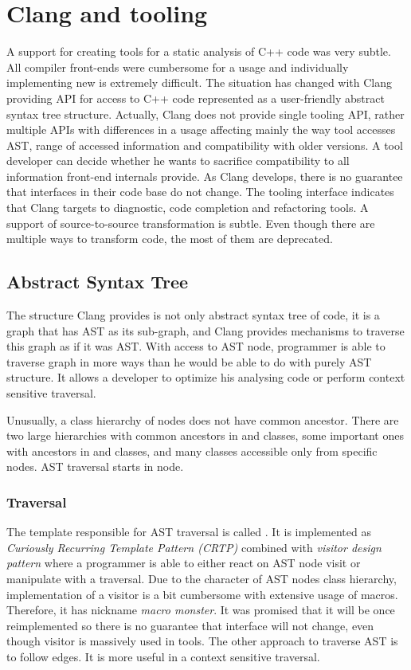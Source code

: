 \chapter{Clang and tooling}
\label{clang}
A support for creating tools for a static analysis of C++ code was very subtle. All compiler front-ends were cumbersome for a usage and individually implementing new is extremely difficult. The situation has changed with Clang providing API for access to C++ code represented as a user-friendly abstract syntax tree structure. Actually, Clang does not provide single tooling API, rather multiple APIs with differences in a usage affecting mainly the way tool accesses AST, range of accessed information and compatibility with older versions. A tool developer can decide whether he wants to sacrifice compatibility to all information front-end internals provide. As Clang develops, there is no guarantee that interfaces in their code base do not change. The tooling interface indicates that Clang targets to diagnostic, code completion and refactoring tools. A support of source-to-source transformation is subtle. Even though there are multiple ways to transform code, the most of them are deprecated.

\section{Abstract Syntax Tree}
The structure Clang provides is not only abstract syntax tree of code, it is a graph that has AST as its sub-graph, and Clang provides mechanisms to traverse this graph as if it was AST. With access to AST node, programmer is able to traverse graph in more ways than he would be able to do with purely AST structure. It allows a developer to optimize his analysing code or perform context sensitive traversal.

Unusually, a class hierarchy of nodes does not have common ancestor. There are two large hierarchies with common ancestors in  and  classes, some important ones with ancestors in  and  classes, and many classes accessible only from specific nodes. AST traversal starts in  node. 

\subsection{Traversal}
\label{clang-ast-traversal}
The template responsible for AST traversal is called . It is implemented as \emph{Curiously Recurring Template Pattern (CRTP)} combined with \emph{visitor design pattern} where a programmer is able to either react on AST node visit or manipulate with a traversal. Due to the character of AST nodes class hierarchy, implementation of a visitor is a bit cumbersome with extensive usage of macros. Therefore, it has nickname \textit{macro monster}. It was promised that it will be once reimplemented so there is no guarantee that interface will not change, even though visitor is massively used in tools. The other approach to traverse AST is to follow edges. It is more useful in a context sensitive traversal.

